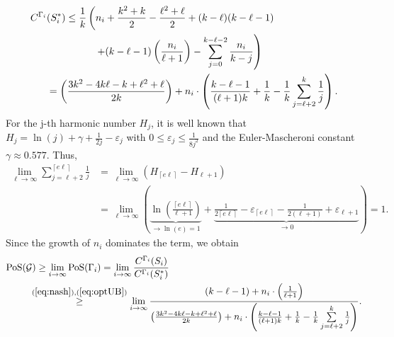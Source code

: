 \begin{align}
    C^{\Gamma_i}&(S^*_i) \leq \frac{1}{k}\left(n_i+\frac{k^2+k}{2} - \frac{\ell^2+\ell}{2} + (k-\ell)(k-\ell-1) \right.\nonumber\\
    &\hspace{1.7cm}\left.+ (k-\ell-1)\left( \frac{n_i}{\ell+1}\right) - \sum\limits_{j=0}^{k-\ell-2} \frac{n_i}{k-j}\right)\nonumber\\
    &= \left( \frac{3k^2-4k\ell-k+\ell^2+\ell}{2k}\right) + n_i \cdot \left( \frac{k-\ell-1}{(\ell+1)k} + \frac{1}{k} -\frac{1}{k}\sum\limits_{j=\ell+2}^{k} \frac{1}{j}\right).\label{eq:optUB}
\end{align}
For the j-th harmonic number $H_j$, it is well known that $H_j= \ln(j) + \gamma + \frac{1}{2j} - \varepsilon_j$ with $0\leq \varepsilon_j \leq \frac{1}{8j^2}$ and the Euler-Mascheroni constant $\gamma \approx 0.577$. Thus,
\begin{align}
    \lim\limits_{\ell \rightarrow \infty} \sum\limits_{j=\ell+2}^{\left\lceil e \ell\right\rceil} \frac{1}{j} 
    &= \lim\limits_{\ell \rightarrow \infty} \left(H_{\left\lceil e \ell\right\rceil}-H_{\ell+1}\right)\nonumber \\
    &=  \lim\limits_{\ell \rightarrow \infty} \left(\underbrace{\ln\left(\frac{\left\lceil e \ell\right\rceil}{\ell+1}\right)}_{\rightarrow \ln(e) = 1} + \underbrace{\frac{1}{2\left\lceil e \ell\right\rceil} - \varepsilon_{\left\lceil e \ell\right\rceil} - \frac{1}{2(\ell+1)} + \varepsilon_{\ell+1}}_{\rightarrow 0}\right) = 1 .\label{eq:harmonic}
\end{align}
Since the growth of $n_i$ dominates the term, we obtain 
\begin{align*}
    \PoS(\mathcal{G}) &\geq \lim\limits_{i \rightarrow \infty} \PoS(\Gamma_i) =\lim\limits_{i \rightarrow \infty} \frac{C^{\Gamma_i}(S_i)}{C^{\Gamma_i}(S^*_i)}\\
    &\hspace{-0.25cm}\overset{(\ref{eq:nash}), (\ref{eq:optUB}) }{\geq }\lim\limits_{i \rightarrow \infty} \frac{(k-\ell -1) + n_i\cdot \left(\frac{1}{\ell+1}\right)}{ \left( \frac{3k^2-4k\ell-k+\ell^2+\ell}{2k}\right) + n_i \cdot \left( \frac{k-\ell-1}{(\ell+1)k} + \frac{1}{k} -\frac{1}{k}\sum\limits_{j=\ell+2}^{k} \frac{1}{j}\right)}.
\end{align*}
